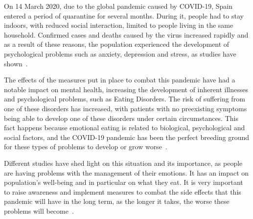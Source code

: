 
On 14 March 2020, due to the global pandemic caused by COVID-19, Spain entered a period of quarantine for several months. During it, people had to stay indoors, with reduced social interaction, limited to people living in the same household. Confirmed cases and deaths caused by the virus increased rapidly and as a result of these reasons, the population experienced the development of psychological problems such as anxiety, depression and stress, as studies have shown~\cite{ramirez2021repercusiones}.

The effects of the measures put in place to combat this pandemic have had a notable impact on mental health, increasing the development of inherent illnesses and psychological problems, such as Eating Disorders. The risk of suffering from one of these disorders has increased, with patients with no preexisting symptoms being able to develop one of these disorders under certain circumstances. This fact happens because emotional eating is related to biological, psychological and social factors, and the COVID-19 pandemic has been the perfect breeding ground for these types of problems to develop or grow worse~\cite{dos2022emotional}.

Different studies have shed light on this situation and its importance, as people are having problems with the management of their emotions. It has an impact on population's well-being and in particular on what they eat. It is very important to raise awareness and implement measures to combat the side effects that this pandemic will have in the long term, as the longer it takes, the worse these problems will become~\cite{touyz2020eating}.




